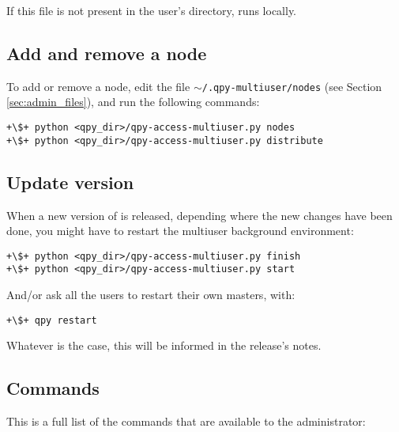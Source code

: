 \documentclass[a4paper,12pt]{article}
\begin{document}
If this file is not present in the user's \qpy{} directory, \qpy{} runs locally.

\subsection{Add and remove a node}

To add or remove a node, edit the file \texttt{$\sim$/.qpy-multiuser/nodes} (see Section \ref{sec:admin_files}), and run the following commands:

\begin{lstlisting}[style=BashStyle]
+\$+ python <qpy_dir>/qpy-access-multiuser.py nodes
+\$+ python <qpy_dir>/qpy-access-multiuser.py distribute
\end{lstlisting}

\subsection{Update version}

When a new version of \qpy{} is released, depending where the new changes have been done, you might have to restart the multiuser background environment:

\begin{lstlisting}[style=BashStyle]
+\$+ python <qpy_dir>/qpy-access-multiuser.py finish
+\$+ python <qpy_dir>/qpy-access-multiuser.py start
\end{lstlisting}

And/or ask all the users to restart their own masters, with:

\begin{lstlisting}[style=BashStyle]
+\$+ qpy restart
\end{lstlisting}

Whatever is the case, this will be informed in the release's notes.


\subsection{Commands}

This is a full list of the commands that are available to the administrator:
\end{document}
